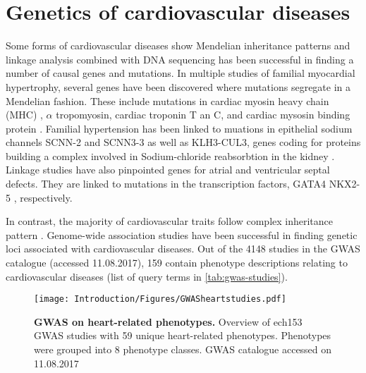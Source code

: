 

\section{Genetics of cardiovascular diseases}

Some forms of cardiovascular diseases show Mendelian inheritance patterns and linkage analysis combined with DNA sequencing has been successful in finding a number of causal genes and mutations. 
In multiple studies of familial myocardial hypertrophy, several genes have been discovered where mutations segregate in a Mendelian fashion. These include mutations in cardiac myosin heavy chain (MHC) \citep{Geisterfer-Lowrance1990}, \(\alpha\) tropomyosin, cardiac troponin T an C, \citep{Thierfelder1994, Kimuara1997} and cardiac mysosin binding protein \citep{Carrier1993,Bonne1995}. Familial hypertension has been linked to muations in epithelial sodium channels  SCNN-2 and SCNN3-3 \citep{Boyden2012,Glover2014} as well as KLH3-CUL3, genes coding for proteins building a complex involved in Sodium-chloride reabsorbtion in the kidney  \citep{Hanssen1995}. Linkage studies have also pinpointed genes for atrial and ventricular septal defects. They are linked to mutations in the transcription factors,  GATA4 \citep{Schott1998} NKX2-5 \citep{Garg2003}, respectively. 

In contrast, the majority of cardiovascular traits follow complex inheritance pattern \citep{Kathiresan2012}. Genome-wide association studies have been successful in finding genetic loci associated with cardiovascular diseases. Out of the \num{4148} studies in the GWAS catalogue (accessed 11.08.2017), \num{159} contain phenotype descriptions relating to cardiovascular diseases (list of query terms in \cref{tab:gwas-studies}).
\\
\begin{figure}[hbtp]
	\centering
	\texttt{[image: Introduction/Figures/GWASheartstudies.pdf]}
	\caption[\textbf{GWAS on heart-related phenotypes. }]{\textbf{GWAS on heart-related phenotypes. } Overview of ech\num{153} GWAS studies with \num{59} unique heart-related phenotypes. Phenotypes were grouped into \num{8} phenotype classes. GWAS catalogue accessed on 11.08.2017} 
	 	\label{fig:gwas-heart}
\end{figure}

